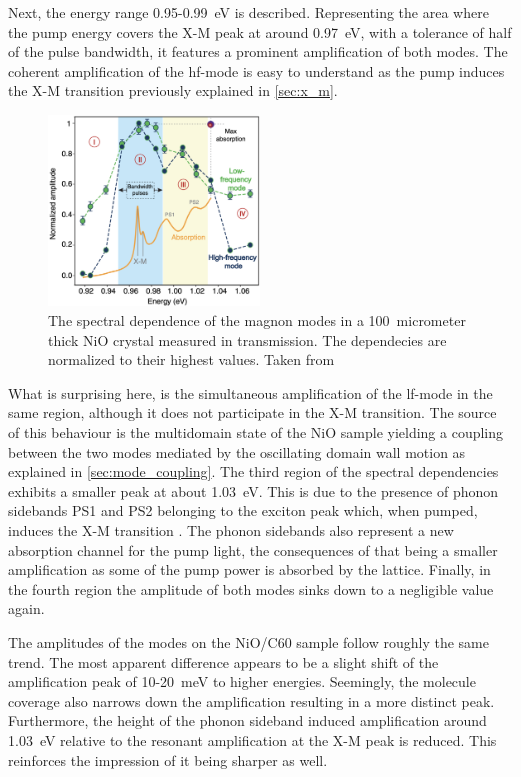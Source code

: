 Next, the energy range 0.95-\qty{0.99}{eV} is described.
Representing the area where the pump energy covers the X-M peak at around \qty{0.97}{eV}, with a tolerance of half of the pulse bandwidth, it features a prominent amplification of both modes.
The coherent amplification of the hf-mode is easy to understand as the pump induces the X-M transition previously explained in \autoref{sec:x_m}.
\begin{figure}[ht]
    \centering
    \includegraphics[width=0.5\textwidth]{pictures/7.png}
    \caption{The spectral dependence of the magnon modes in a \qty{100}{micrometer} thick NiO crystal measured in transmission. The dependecies are normalized to their highest values. Taken from }
    \label{fig:7}
\end{figure}
\FloatBarrier
What is surprising here, is the simultaneous amplification of the lf-mode in the same region, although it does not participate in the X-M transition.
The source of this behaviour is the multidomain state of the NiO sample yielding a coupling between the two modes mediated by the oscillating domain wall motion as explained in \autoref{sec:mode_coupling}.
The third region of the spectral dependencies exhibits a smaller peak at about \qty{1.03}{eV}.
This is due to the presence of phonon sidebands PS1 and PS2 belonging to the exciton peak which, when pumped, induces the X-M transition .
The phonon sidebands also represent a new absorption channel for the pump light, the consequences of that being a smaller amplification as some of the pump power is absorbed by the lattice.
Finally, in the fourth region the amplitude of both modes sinks down to a negligible value again.

The amplitudes of the modes on the NiO/C60 sample follow roughly the same trend.
The most apparent difference appears to be a slight shift of the amplification peak of 10-\qty{20}{meV} to higher energies.
Seemingly, the molecule coverage also narrows down the amplification resulting in a more distinct peak.
Furthermore, the height of the phonon sideband induced amplification around \qty{1.03}{eV} relative to the resonant amplification at the X-M peak is reduced.
This reinforces the impression of it being sharper as well.

